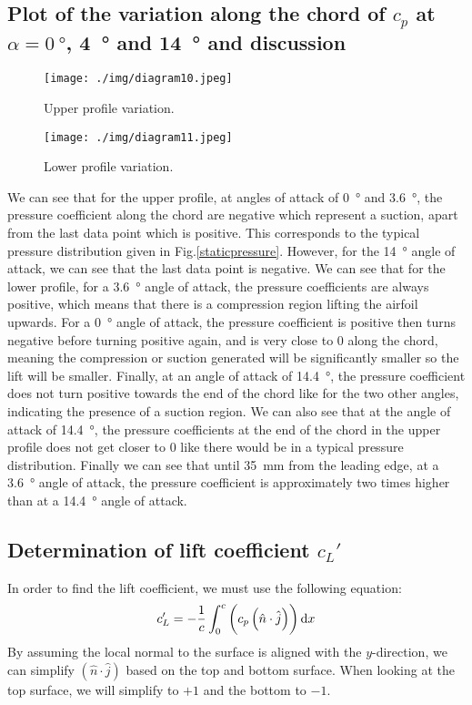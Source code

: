 \subsection{Plot of the variation along the chord of $c_p$ at $\alpha = \SI{0}{\degree}$, \SI{4}{\degree} and \SI{14}{\degree} and discussion}
\begin{figure}[H]
    \centering
    \texttt{[image: ./img/diagram10.jpeg]}
    \caption{Upper profile variation.}
\end{figure}
\begin{figure}[H]
    \centering
    \texttt{[image: ./img/diagram11.jpeg]}
    \caption{Lower profile variation.}
\end{figure}
We can see that for the upper profile, at angles of attack of \SI{0}{\degree} and \SI{3.6}{\degree}, the pressure coefficient along the chord are negative which represent a suction, apart from the last data point which is positive. This corresponds to the typical pressure distribution given in Fig.\ref{staticpressure}. However, for the \SI{14}{\degree} angle of attack, we can see that the last data point is negative. We can see that for the lower profile, for a \SI{3.6}{\degree} angle of attack, the pressure coefficients are always positive, which means that there is a compression region lifting the airfoil upwards. For a \SI{0}{\degree} angle of attack, the pressure coefficient is positive then turns negative before turning positive again, and is very close to 0 along the chord, meaning the compression or suction generated will be significantly smaller so the lift will be smaller. Finally, at an angle of attack of \SI{14.4}{\degree}, the pressure coefficient does not turn positive towards the end of the chord like for the two other angles, indicating the presence of a suction region. We can also see that at the angle of attack of \SI{14.4}{\degree}, the pressure coefficients at the end of the chord in the upper profile does not get closer to 0 like there would be in a typical pressure distribution. Finally we can see that until \SI{35}{\milli\meter} from the leading edge, at a \SI{3.6}{\degree} angle of attack, the pressure coefficient is approximately two times higher than at a \SI{14.4}{\degree} angle of attack.
\subsection{Determination of lift coefficient $c_L'$}
In order to find the lift coefficient, we must use the following equation:
\begin{align}
    c_L' = -\frac{1}{c} \int_0^c \left(c_p \left(\hat{n}\cdot \hat{j}\right)\right)\dif x
\end{align}
By assuming the local normal to the surface is aligned with the $y$-direction, we can simplify $\left(\hat{n}\cdot \hat{j}\right)$ based on the top and bottom surface. When looking at the top surface, we will simplify to $+1$ and the bottom to $-1$.

